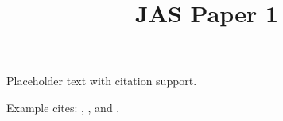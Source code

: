 \documentclass{article}
\title{JAS Paper 1}
\author{}
\date{}
\begin{document}
\maketitle

Placeholder text with citation support.

Example cites: \cite{Rink2025Coordinate}, \cite{Kuehn2026Emergent}, and \cite{Petrova2024Propagating}.

\printbibliography
\end{document}
